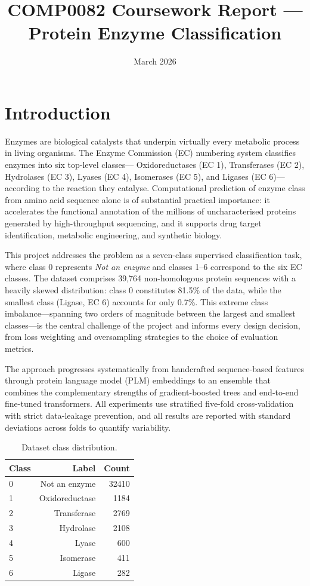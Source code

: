\documentclass[11pt,a4paper]{article}
\title{COMP0082 Coursework Report --- Protein Enzyme Classification}
\author{}
\date{March 2026}
\begin{document}
\maketitle

\section{Introduction}
Enzymes are biological catalysts that underpin virtually every metabolic process in living organisms.
The Enzyme Commission (EC) numbering system classifies enzymes into six top-level classes---
Oxidoreductases (EC 1), Transferases (EC 2), Hydrolases (EC 3), Lyases (EC 4),
Isomerases (EC 5), and Ligases (EC 6)---according to the reaction they catalyse.
Computational prediction of enzyme class from amino acid sequence alone is of substantial practical
importance: it accelerates the functional annotation of the millions of uncharacterised proteins
generated by high-throughput sequencing, and it supports drug target identification,
metabolic engineering, and synthetic biology.

This project addresses the problem as a seven-class supervised classification task, where class 0
represents \textit{Not an enzyme} and classes 1--6 correspond to the six EC classes.
The dataset comprises 39,764 non-homologous protein sequences with a heavily skewed distribution:
class 0 constitutes 81.5\% of the data, while the smallest class (Ligase, EC 6) accounts for only 0.7\%.
This extreme class imbalance---spanning two orders of magnitude between the largest and smallest
classes---is the central challenge of the project and informs every design decision,
from loss weighting and oversampling strategies to the choice of evaluation metrics.

The approach progresses systematically from handcrafted sequence-based features through protein
language model (PLM) embeddings to an ensemble that combines the complementary strengths of
gradient-boosted trees and end-to-end fine-tuned transformers.
All experiments use stratified five-fold cross-validation with strict data-leakage prevention,
and all results are reported with standard deviations across folds to quantify variability.

\begin{table}[H]
\centering
\caption{Dataset class distribution.}
\begin{tabular}{lrr}
\toprule
Class & Label & Count \\
\midrule
0 & Not an enzyme & 32410 \\
1 & Oxidoreductase & 1184 \\
2 & Transferase & 2769 \\
3 & Hydrolase & 2108 \\
4 & Lyase & 600 \\
5 & Isomerase & 411 \\
6 & Ligase & 282 \\
\bottomrule
\end{tabular}
\end{table}
\end{document}
